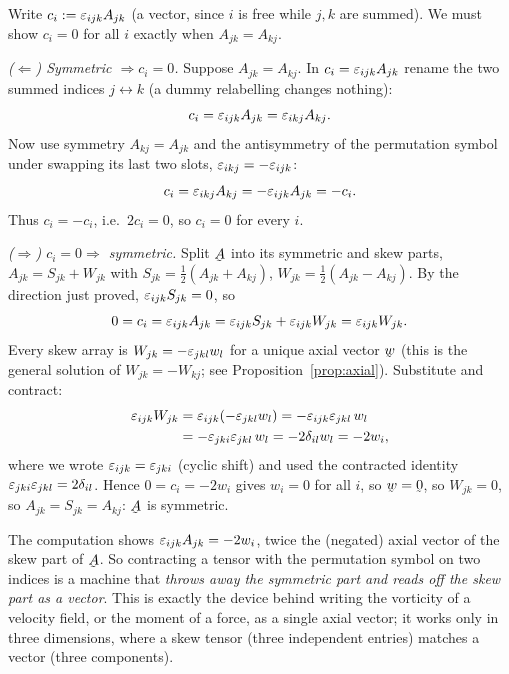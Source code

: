 \begin{problem}[$\eps_{ijk}A_{jk}=0\iff\bA=\bA^{t}$]
\end{problem}
\begin{solution}
Write $c_i:=\varepsilon_{ijk}A_{jk}$ (a vector, since $i$ is free while $j,k$ are
summed). We must show $c_i=0$ for all $i$ exactly when $A_{jk}=A_{kj}$.

\emph{($\Leftarrow$) Symmetric $\Rightarrow c_i=0$.} Suppose $A_{jk}=A_{kj}$.
In $c_i=\varepsilon_{ijk}A_{jk}$ rename the two summed indices $j\leftrightarrow k$
(a dummy relabelling changes nothing):
\[
c_i=\varepsilon_{ijk}A_{jk}=\varepsilon_{ikj}A_{kj}.
\]
Now use symmetry $A_{kj}=A_{jk}$ and the antisymmetry of the permutation
symbol under swapping its last two slots, $\varepsilon_{ikj}=-\varepsilon_{ijk}$:
\[
c_i=\varepsilon_{ikj}A_{kj}=-\varepsilon_{ijk}A_{jk}=-c_i .
\]
Thus $c_i=-c_i$, i.e.\ $2c_i=0$, so $c_i=0$ for every $i$.

\emph{($\Rightarrow$) $c_i=0\Rightarrow$ symmetric.} Split $\bA$ into its
symmetric and skew parts, $A_{jk}=S_{jk}+W_{jk}$ with
$S_{jk}=\tfrac12(A_{jk}+A_{kj})$, $W_{jk}=\tfrac12(A_{jk}-A_{kj})$. By the
direction just proved, $\varepsilon_{ijk}S_{jk}=0$, so
\[
0=c_i=\varepsilon_{ijk}A_{jk}=\varepsilon_{ijk}S_{jk}+\varepsilon_{ijk}W_{jk}=\varepsilon_{ijk}W_{jk}.
\]
Every skew array is $W_{jk}=-\varepsilon_{jkl}w_l$ for a unique axial vector $\bw$
(this is the general solution of $W_{jk}=-W_{kj}$; see
Proposition~\ref{prop:axial}). Substitute and contract:
\[
\begin{aligned}
\varepsilon_{ijk}W_{jk}&=\varepsilon_{ijk}(-\varepsilon_{jkl}w_l)=-\varepsilon_{ijk}\varepsilon_{jkl}\,w_l\\
&=-\varepsilon_{jki}\varepsilon_{jkl}\,w_l=-2\delta_{il}w_l=-2w_i,
\end{aligned}
\]
where we wrote $\varepsilon_{ijk}=\varepsilon_{jki}$ (cyclic shift) and used the contracted
identity $\varepsilon_{jki}\varepsilon_{jkl}=2\delta_{il}$. Hence $0=c_i=-2w_i$ gives
$w_i=0$ for all $i$, so $\bw=\bze$, so $W_{jk}=0$, so $A_{jk}=S_{jk}=A_{kj}$:
$\bA$ is symmetric.
\end{solution}

\begin{remark}\label{rem:p5use}
The computation shows $\varepsilon_{ijk}A_{jk}=-2w_i$, twice the (negated) axial
vector of the skew part of $\bA$. So contracting a tensor with the
permutation symbol on two indices is a machine that \emph{throws away the
symmetric part and reads off the skew part as a vector}. This is exactly the
device behind writing the vorticity of a velocity field, or the moment of a
force, as a single axial vector; it works only in three dimensions, where a
skew tensor (three independent entries) matches a vector (three
components).
\end{remark}

